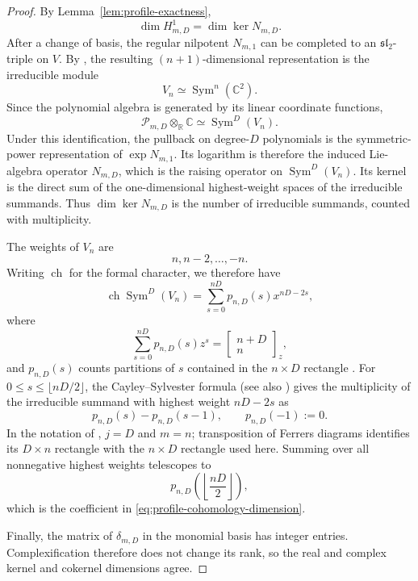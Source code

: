 \documentclass[11pt]{amsart}
\theoremstyle{plain}
\theoremstyle{definition}
\theoremstyle{remark}
\numberwithin{equation}{section}
\theoremstyle{plain}
\begin{document}
\begin{proof}
	By Lemma~\ref{lem:profile-exactness},
	\[
	\dim H^1_{m,D}=\dim\ker N_{m,D}.
	\]
	After a change of basis, the regular nilpotent $N_{m,1}$ can be completed
	to an $\mathfrak{sl}_2$-triple on $V$.  By \cite{FultonHarris}, the resulting
	$(n+1)$-dimensional representation is the irreducible module
	\[
	V_n\simeq\operatorname{Sym}^n(\mathbb C^2).
	\]
	Since the polynomial algebra is generated by its
	linear coordinate functions,
	\[
	\mathscr P_{m,D}\otimes_{\mathbb R}\mathbb C
	\simeq\operatorname{Sym}^D(V_n).
	\]
	Under this identification, the pullback on degree-$D$ polynomials is the
	symmetric-power representation of $\exp N_{m,1}$.  Its logarithm is
	therefore the induced Lie-algebra operator $N_{m,D}$, which is the raising
	operator on $\operatorname{Sym}^D(V_n)$.  Its kernel is the direct
	sum of the one-dimensional highest-weight spaces of the irreducible
	summands.  Thus
	$\dim\ker N_{m,D}$ is the number of irreducible summands, counted with
	multiplicity.
	
	The weights of $V_n$ are
	\[
	n,n-2,\ldots,-n.
	\]
	Writing $\operatorname{ch}$ for the formal character, we therefore have
	\[
	\operatorname{ch}\operatorname{Sym}^D(V_n)
	=\sum_{s=0}^{nD}p_{n,D}(s)x^{nD-2s},
	\]
	where
	\begin{equation}\label{eq:rectangle-partition-generating-function}
		\sum_{s=0}^{nD}p_{n,D}(s)z^s
		=\begin{bmatrix}n+D\\ n\end{bmatrix}_z,
	\end{equation}
	and $p_{n,D}(s)$ counts partitions of $s$ contained in the
	$n\times D$ rectangle \cite{StanleyEC1}.  For
	$0\le s\le\lfloor nD/2\rfloor$, the Cayley--Sylvester formula \cite{CayleySecondQuantics} (see also
	\cite[(4.1)]{MajidTomasic}) gives the
	multiplicity of the irreducible summand with highest weight $nD-2s$ as
	\[
	p_{n,D}(s)-p_{n,D}(s-1),
	\qquad p_{n,D}(-1):=0.
	\]
	In the notation of \cite[(4.1)]{MajidTomasic}, $j=D$ and $m=n$;
	transposition of Ferrers diagrams identifies its $D\times n$ rectangle
	with the $n\times D$ rectangle used here. 
	Summing over all nonnegative highest weights telescopes to
	\[
	p_{n,D}\!\left(\left\lfloor\frac{nD}{2}\right\rfloor\right),
	\]
	which is the coefficient in \eqref{eq:profile-cohomology-dimension}.
	
	Finally, the matrix of $\delta_{m,D}$ in the monomial basis has integer
	entries.  Complexification therefore does not change its rank, so the real
	and complex kernel and cokernel dimensions agree.
\end{proof}
\end{document}
